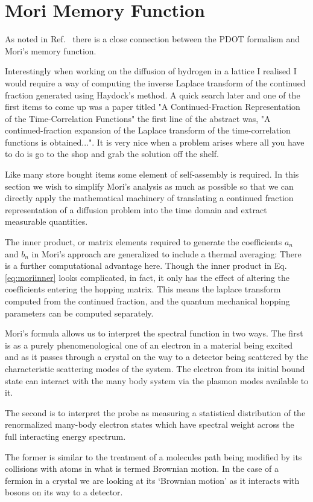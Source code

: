 \section{Mori Memory Function}
\label{sec:morimemory}
  As noted in Ref.~\cite{annett94} there is a close connection between the PDOT
formalism and Mori's memory function. 

Interestingly when working on the diffusion
of hydrogen in a lattice I realised I would require a way of computing the
inverse Laplace transform of the continued fraction generated 
using Haydock's method. A quick search later and one of the first items to come up
was a paper titled "A Continued-Fraction Representation of the Time-Correlation
Functions" the first line of the abstract was, "A continued-fraction expansion of the Laplace
transform of the time-correlation functions is obtained...". It is very nice when a problem
arises where all you have to do is go to the shop and grab the solution off the shelf.

Like many store bought items some element of self-assembly is required. In this
section we wish to simplify Mori's analysis as much as possible so that we can directly 
apply the mathematical machinery of translating a continued fraction representation of
a diffusion problem into the time domain and extract measurable quantities.

The inner product, or matrix elements required to generate the coefficients 
$a_{n}$ and $b_{n}$ in Mori's approach are generalized to include a thermal averaging:
There is a further computational advantage here. Though the inner product in Eq.\ref{eq:moriinner}
looks complicated, in fact, it only has the effect of altering the coefficients entering
the hopping matrix. This means the laplace transform computed from the continued fraction,
and the quantum mechanical hopping parameters can be computed separately.

Mori's formula allows us to interpret the spectral function in two ways. The first is as
a purely phenomenological one of an electron in a material being excited and as it passes through
a crystal on the way to a detector being scattered by the characteristic scattering modes of the
system. The electron from its initial bound state can interact with the many body system via
the plasmon modes available to it.

The second is to interpret the probe as measuring a statistical distribution of the 
renormalized many-body electron states which have spectral weight across the full
interacting energy spectrum. 

The former is similar to the treatment of a molecules path
being modified by its collisions with atoms in what is termed Brownian motion. In the
case of a fermion in a crystal we are looking at its `Brownian motion' as it interacts
with bosons on its way to a detector. 


